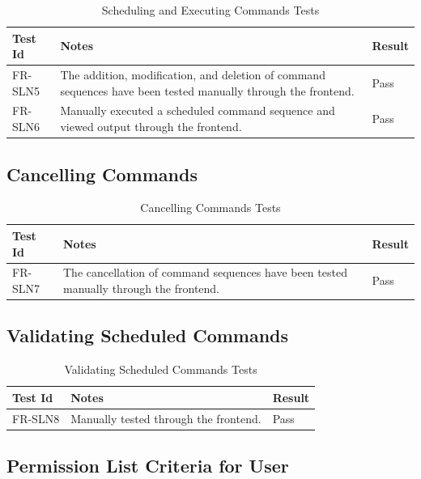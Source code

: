 \documentclass[12pt, titlepage]{article}
\begin{document}
\begin{center}
\begin{longtable}{|p{2cm} | p{8cm} |p{2cm}| }
\caption{Scheduling and Executing Commands Tests}
\hline
\textbf{Test Id} & \textbf{Notes} & \textbf{Result} \\
\hline
FR-SLN5 & The addition, modification, and deletion of command sequences have been tested manually through the frontend. & Pass \\
\hline
FR-SLN6 & Manually executed a scheduled command sequence and viewed output through the frontend. & Pass \\
\hline

\end{longtable}
\end{center}

\subsection{Cancelling Commands}

\begin{center}
\begin{longtable}{|p{2cm} | p{8cm} |p{2cm}| }
\caption{Cancelling Commands Tests}
\hline
\textbf{Test Id} & \textbf{Notes} & \textbf{Result} \\
\hline
FR-SLN7 & The cancellation of command sequences have been tested manually through the frontend. & Pass \\
\hline

\end{longtable}
\end{center}

\subsection{Validating Scheduled Commands}

\begin{center}
\begin{longtable}{|p{2cm} | p{8cm} |p{2cm}| }
\caption{Validating Scheduled Commands Tests}
\hline
\textbf{Test Id} & \textbf{Notes} & \textbf{Result} \\
\hline
FR-SLN8 & Manually tested through the frontend. & Pass \\
\hline

\end{longtable}
\end{center}

\subsection{Permission List Criteria for User}
\end{document}
